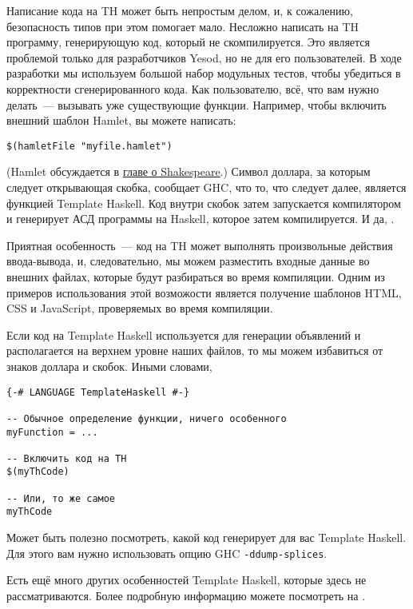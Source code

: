 Написание кода на TH может быть непростым делом, и, к сожалению, безопасность
типов при этом помогает мало. Несложно написать на TH программу, генерирующую
код, который не скомпилируется. Это является проблемой только для разработчиков
Yesod, но не для его пользователей. В ходе разработки мы используем большой
набор модульных тестов, чтобы убедиться в корректности сгенерированного кода.
Как пользователю, всё, что вам нужно делать~--- вызывать уже существующие
функции. Например, чтобы включить внешний шаблон Hamlet, вы можете написать:

\begin{lstlisting}
$(hamletFile "myfile.hamlet")
\end{lstlisting}

(Hamlet обсуждается в \hyperref[chap:shakespeare]{главе о Shakespeare}.) Символ
доллара, за которым следует открывающая скобка, сообщает GHC, что то, что
следует далее, является функцией Template Haskell. Код внутри скобок затем
запускается компилятором и генерирует АСД программы на Haskell, которое затем
компилируется. И да,
.

Приятная особенность~--- код на TH может выполнять произвольные действия
ввода-вывода, и, следовательно, мы можем разместить входные данные во внешних
файлах, которые будут разбираться во время компиляции. Одним из примеров
использования этой возможости является получение шаблонов HTML, CSS и
JavaScript, проверяемых во время компиляции.

Если код на Template Haskell используется для генерации объявлений и
располагается на верхнем уровне наших файлов, то мы можем избавиться от знаков
доллара и скобок. Иными словами,

\begin{lstlisting}
{-# LANGUAGE TemplateHaskell #-}

-- Обычное определение функции, ничего особенного
myFunction = ...

-- Включить код на TH
$(myThCode)

-- Или, то же самое
myThCode
\end{lstlisting}

Может быть полезно посмотреть, какой код генерирует для вас Template Haskell.
Для этого вам нужно использовать опцию GHC \texttt{-ddump-splices}.

\begin{remark}
    Есть ещё много других особенностей Template Haskell, которые здесь не
    рассматриваются. Более подробную информацию можете посмотреть на
    .
\end{remark}


